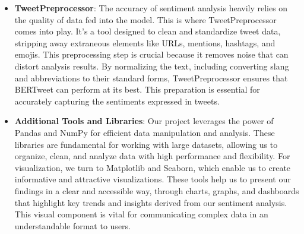 \documentclass[conference]{IEEEtran}
\begin{document}
\begin{itemize}
    \item \textbf{TweetPreprocessor}: The accuracy of sentiment analysis heavily relies on the quality of data fed into the model. This is where TweetPreprocessor comes into play. It's a tool designed to clean and standardize tweet data, stripping away extraneous elements like URLs, mentions, hashtags, and emojis. This preprocessing step is crucial because it removes noise that can distort analysis results. By normalizing the text, including converting slang and abbreviations to their standard forms, TweetPreprocessor ensures that BERTweet can perform at its best. This preparation is essential for accurately capturing the sentiments expressed in tweets.

    \item \textbf{Additional Tools and Libraries}: Our project leverages the power of Pandas and NumPy for efficient data manipulation and analysis. These libraries are fundamental for working with large datasets, allowing us to organize, clean, and analyze data with high performance and flexibility. For visualization, we turn to Matplotlib and Seaborn, which enable us to create informative and attractive visualizations. These tools help us to present our findings in a clear and accessible way, through charts, graphs, and dashboards that highlight key trends and insights derived from our sentiment analysis. This visual component is vital for communicating complex data in an understandable format to users.
\end{itemize}
\end{document}
